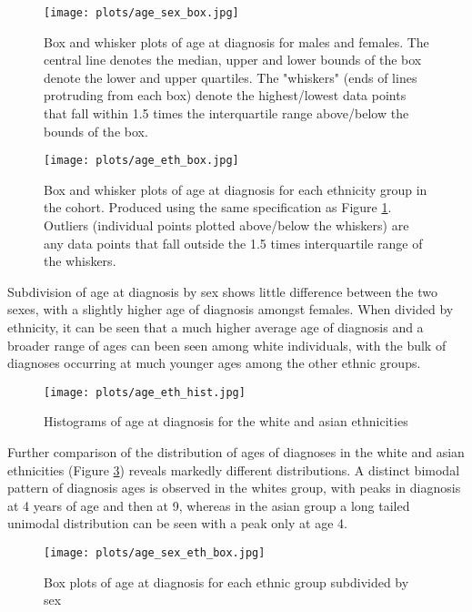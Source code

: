 \documentclass[
]{article}
\begin{document}
\begin{figure}[H]
\centering
\texttt{[image: plots/age\_sex\_box.jpg]}
\caption{Box and whisker plots of age at diagnosis for males and females. The central line denotes the median, upper and lower bounds of the box denote the lower and upper quartiles. The "whiskers" (ends of lines protruding from each box) denote the highest/lowest data points that fall within 1.5 times the interquartile range above/below the bounds of the box.}
\label{fig:age_sex_box}
\end{figure}

\begin{figure}[H]
\centering
\texttt{[image: plots/age\_eth\_box.jpg]}
\caption{Box and whisker plots of age at diagnosis for each ethnicity group in the cohort. Produced using the same specification as Figure \ref{fig:age_sex_box}. Outliers (individual points plotted above/below the whiskers) are any data points that fall outside the 1.5 times interquartile range of the whiskers.}
\label{fig:age_eth_box}
\end{figure}

Subdivision of age at diagnosis by sex shows little difference between
the two sexes, with a slightly higher age of diagnosis amongst females.
When divided by ethnicity, it can be seen that a much higher average age
of diagnosis and a broader range of ages can been seen among white
individuals, with the bulk of diagnoses occurring at much younger ages
among the other ethnic groups.

\begin{figure}[H]
\centering
\texttt{[image: plots/age\_eth\_hist.jpg]}
\caption{Histograms of age at diagnosis for the white and asian ethnicities}
\label{fig:age_eth_hist}
\end{figure}

Further comparison of the distribution of ages of diagnoses in the white
and asian ethnicities (Figure \ref{fig:age_eth_hist}) reveals markedly
different distributions. A distinct bimodal pattern of diagnosis ages is
observed in the whites group, with peaks in diagnosis at 4 years of age
and then at 9, whereas in the asian group a long tailed unimodal
distribution can be seen with a peak only at age 4.

\begin{figure}[H]
\centering
\texttt{[image: plots/age\_sex\_eth\_box.jpg]}
\caption{Box plots of age at diagnosis for each ethnic group subdivided by sex}
\label{fig:age_sex_eth_box}
\end{figure}
\end{document}
